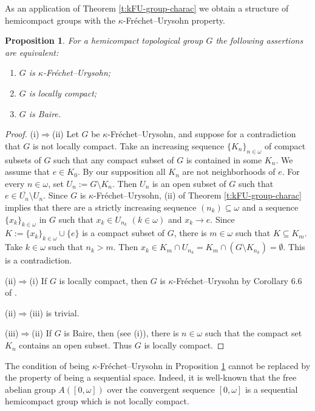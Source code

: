 \documentclass[preprint,11pt]{elsarticle}
\newtheorem{proposition}[theorem]{Proposition}
\theoremstyle{definition}
\theoremstyle{remark}
\numberwithin{equation}{section}
\numberwithin{theorem}{section}
\newcommand{\w}{\omega}
\newcommand{\Ra}{\Rightarrow}
\newcommand{\SM}{{\setminus}}
\begin{document}

As an application of Theorem \ref{t:kFU-group-charac} we obtain a structure of hemicompact groups with the $\kappa$-Fr\'{e}chet--Urysohn property.

\begin{proposition} \label{p:kFU-hemicompact}
For a hemicompact topological group  $G$ the following assertions are equivalent:
\begin{enumerate}
\item[{\rm(i)}] $G$ is $\kappa$-Fr\'{e}chet--Urysohn;
\item[{\rm(ii)}]  $G$ is locally compact;
\item[{\rm(iii)}] $G$ is Baire.
\end{enumerate}
\end{proposition}

\begin{proof}
(i)$\Ra$(ii) Let $G$ be $\kappa$-Fr\'{e}chet--Urysohn, and suppose for a contradiction that $G$ is not locally compact. Take an increasing sequence $\{K_n\}_{n\in\w}$ of compact subsets of $G$ such that any compact subset of $G$ is contained in some $K_n$. We assume that $e\in K_0$. By our supposition all $K_n$ are not neighborhoods of $e$. For every $n\in\w$, set $U_n:=G\SM K_n$. Then $U_n$ is an open subset of $G$ such that $e\in \overline{U_n}\SM U_n$. Since  $G$ is $\kappa$-Fr\'{e}chet--Urysohn, (ii) of Theorem \ref{t:kFU-group-charac} implies that there are a strictly increasing sequence $(n_k)\subseteq \w$ and a sequence $\{x_k\}_{k\in\w}$ in $G$ such that $x_k\in U_{n_k}$ $(k\in\w)$ and $x_k\to e$. Since $K:=\{x_k\}_{k\in\w}\cup\{e\}$ is a compact subset of $G$, there is $m\in \w$ such that $K\subseteq K_m$. Take $k\in\w$ such that $n_k>m$. Then $x_k\in K_m\cap  U_{n_k}=K_m\cap (G\SM  K_{n_k})=\emptyset$. This is a contradiction.

(ii)$\Ra$(i) If $G$ is locally compact, then $G$ is $\kappa$-Fr\'{e}chet--Urysohn by Corollary 6.6 %
of \cite{GR-compact}.

(ii)$\Ra$(iii) is trivial.

(iii)$\Ra$(ii) If $G$ is Baire, then (see (i)), there is $n\in\w$ such that the compact set $K_n$ contains an open subset. Thus $G$ is locally compact.
\end{proof}
The condition of being $\kappa$-Fr\'{e}chet--Urysohn in Proposition \ref{p:kFU-hemicompact} cannot be replaced by the property of being a sequential space. Indeed, it is well-known that the free abelian group $A([0,\w])$ over the convergent sequence $[0,\w]$ is a sequential hemicompact group which is not locally compact.
\end{document}
